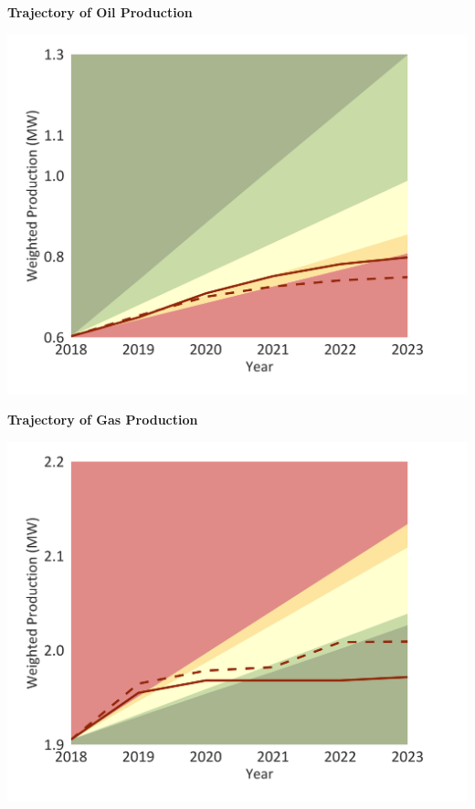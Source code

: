 \documentclass[10pt,table,a4]{article}\usepackage[]{graphicx}\usepackage[]{color}
\begin{document}
		\begin{minipage}[t]{.49\linewidth}
			\textbf{Trajectory of Oil Production }
		
			\includegraphics[trim = {0 0cm 0 0},width=1\linewidth]{CAFigures/Fig18}
			
		\end{minipage}	
		\hspace{.02\linewidth}
		\begin{minipage}[t]{.49\textwidth}
			\textbf{Trajectory of Gas Production }

			\includegraphics[trim = {0 0cm 0 0},width=1\linewidth]{CAFigures/Fig19}
			
		\end{minipage}
		
\end{document}
